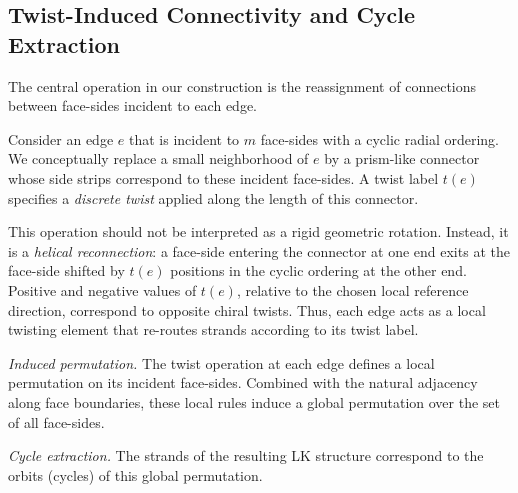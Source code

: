 \documentclass[acmtog]{acmart}
\begin{document}
\subsection{Twist-Induced Connectivity and Cycle Extraction}

The central operation in our construction is the reassignment of connections between face-sides incident to each edge.

Consider an edge $e$ that is incident to $m$ face-sides with a cyclic radial ordering. We conceptually replace a small neighborhood of $e$ by a prism-like connector whose side strips correspond to these incident face-sides. A twist label $t(e)$ specifies a \emph{discrete twist} applied along the length of this connector.

This operation should not be interpreted as a rigid geometric rotation. Instead, it is a \emph{helical reconnection}: a face-side entering the connector at one end exits at the face-side shifted by $t(e)$ positions in the cyclic ordering at the other end. Positive and negative values of $t(e)$, relative to the chosen local reference direction, correspond to opposite chiral twists. Thus, each edge acts as a local twisting element that re-routes strands according to its twist label.

\textit{Induced permutation.}
The twist operation at each edge defines a local permutation on its incident face-sides. Combined with the natural adjacency along face boundaries, these local rules induce a global permutation over the set of all face-sides.

\textit{Cycle extraction.}
The strands of the resulting LK structure correspond to the orbits (cycles) of this global permutation.
\end{document}
